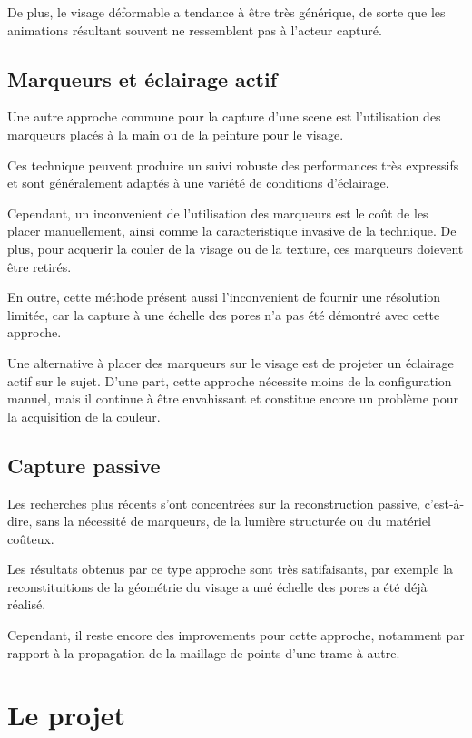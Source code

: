 \documentclass[a4paper,11pt]{article}
\begin{document}
De plus, le visage déformable a tendance à être très générique, de sorte que les animations résultant souvent ne ressemblent pas à l'acteur capturé.

\subsection{Marqueurs et éclairage actif}

Une autre approche commune pour la capture d'une scene est l'utilisation des marqueurs placés à la main ou de la peinture pour le visage.

Ces technique peuvent produire un suivi robuste des performances très expressifs et sont généralement adaptés à une variété de conditions d'éclairage.

Cependant, un inconvenient de l'utilisation des marqueurs est le coût de les placer manuellement, ainsi comme la caracteristique invasive de la technique. De plus, pour acquerir la couler de la visage ou de la texture, ces marqueurs doievent être retirés.

En outre, cette méthode présent aussi l'inconvenient de fournir une résolution limitée, car la capture à une échelle des pores n'a pas été démontré avec cette approche.

Une alternative à placer des marqueurs sur le visage est de projeter un éclairage actif sur le sujet. D'une part, cette approche nécessite moins de la configuration manuel, mais il continue à être envahissant et constitue encore un problème pour la acquisition de la couleur.

\subsection{Capture passive }

Les recherches plus récents s'ont concentrées sur la reconstruction passive, c'est-à-dire, sans la nécessité de marqueurs, de la lumière structurée ou du matériel coûteux.

Les résultats obtenus par ce type approche sont très satifaisants, par exemple la reconstituitions de la géométrie du visage a uné échelle des pores a été déjà réalisé.

Cependant, il reste encore des improvements pour cette approche, notamment par rapport à la propagation de la maillage de points d'une trame à autre.

\section{Le projet}
\end{document}
